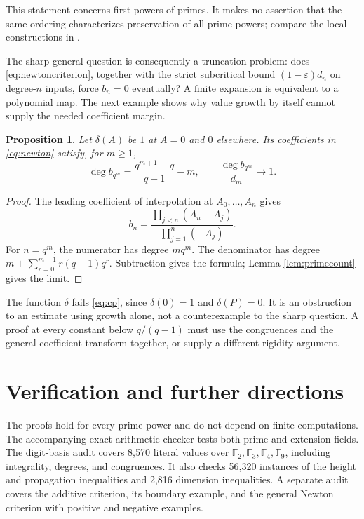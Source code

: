 \documentclass[11pt]{article}
\newtheorem{proposition}[theorem]{Proposition}
\newcommand{\F}{\mathbb F}
\begin{document}
This statement concerns first powers of primes. It makes no assertion
that the same ordering characterizes preservation of all prime powers;
compare the local constructions in \cite[Theorem 1.11]{LS}.

The sharp general question is consequently a truncation problem: does
\eqref{eq:newtoncriterion}, together with the strict subcritical bound
$(1-\varepsilon)d_n$ on degree-$n$ inputs, force $b_n=0$ eventually?
A finite expansion is equivalent to a polynomial map. The next example
shows why value growth by itself cannot supply the needed coefficient
margin.

\begin{proposition}\label{prop:obstruction}
Let $\delta(A)$ be $1$ at $A=0$ and $0$ elsewhere. Its coefficients in
\eqref{eq:newton} satisfy, for $m\ge1$,
\[
 \deg b_{q^m}=\frac{q^{m+1}-q}{q-1}-m,
 \qquad \frac{\deg b_{q^m}}{d_m}\longrightarrow1.
\]
\end{proposition}
\begin{proof}
The leading coefficient of interpolation at $A_0,\ldots,A_n$ gives
\[
 b_n=\frac{\prod_{j<n}(A_n-A_j)}{\prod_{j=1}^n(-A_j)}.
\]
For $n=q^m$, the numerator has degree $mq^m$. The denominator has
degree $m+\sum_{r=0}^{m-1}r(q-1)q^r$. Subtraction gives the formula;
Lemma \ref{lem:primecount} gives the limit.
\end{proof}

The function $\delta$ fails \eqref{eq:cp}, since $\delta(0)=1$ and
$\delta(P)=0$. It is an obstruction to an estimate using growth alone,
not a counterexample to the sharp question. A proof at every constant
below $q/(q-1)$ must use the congruences and the general coefficient
transform together, or supply a different rigidity argument.

\section{Verification and further directions}
The proofs hold for every prime power and do not depend on finite
computations. The accompanying exact-arithmetic checker tests both
prime and extension fields. The digit-basis audit covers 8,570 literal
values over $\F_2,\F_3,\F_4,\F_9$, including integrality, degrees, and
congruences. It also checks 56,320 instances of the height and
propagation inequalities and 2,816 dimension inequalities. A separate
audit covers the additive criterion, its boundary example, and the
general Newton criterion with positive and negative examples.
\end{document}
